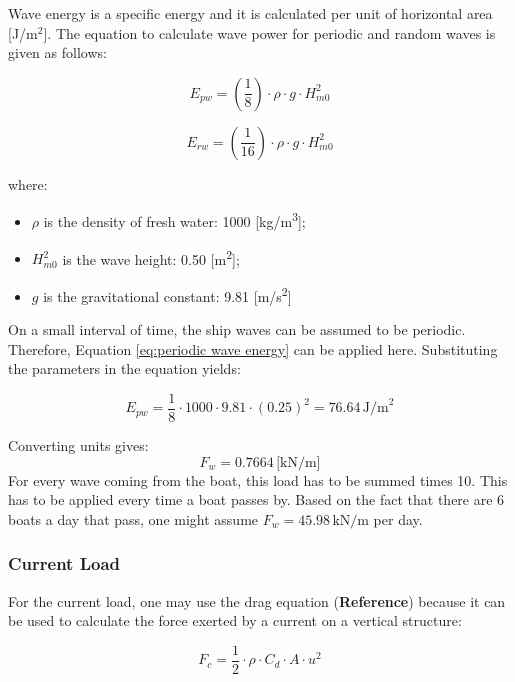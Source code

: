 Wave energy is a specific energy and it is calculated per unit of horizontal area [J/m$^2$]. The equation to calculate wave power for periodic and random waves is given as follows:

\begin{equation}
\label{eq:periodic wave energy}
    {E_{pw} = \left(\frac{1}{8}\right) \cdot \rho \cdot g \cdot H_{m0}^2}
\end{equation}

\begin{equation}
\label{eq:random wave energy}
    {E_{rw} = \left(\frac{1}{16}\right) \cdot \rho \cdot g \cdot H_{m0}^2}
\end{equation}

\noindent where:
\begin{itemize}
    \item $\rho$ is the density of fresh water: 1000 [kg/m\textsuperscript{3}];
    \item \(H_{m0}^2\) is the wave height: 0.50 [m\textsuperscript{2}];
    \item \(g\) is the gravitational constant: 9.81 [m/s\textsuperscript{2}]
\end{itemize}

On a small interval of time, the ship waves can be assumed to be periodic. Therefore, Equation \ref{eq:periodic wave energy} can be applied here. Substituting the parameters in the equation yields: 

$$
E_{pw} = \frac{1}{8} \cdot 1000 \cdot 9.81 \cdot (0.25)^2 = 76.64 \, \text{J/m}^2
$$

Converting units gives:
$$
{F_w}= 0.7664 \, \text{[kN/m]}
$$
For every wave coming from the boat, this load has to be summed times 10. This has to be applied every time a boat passes by. Based on the fact that there are 6 boats a day that pass, one might assume $ F_{w} = 45.98  \, \text{kN/m}$ per day. 

\subsubsection{Current Load}
For the current load, one may use the drag equation (\textbf{Reference})
because it can be used to calculate the force exerted by a current on a vertical structure:

\begin{equation}
\label{eq:drag load}
    F_c = \frac{1}{2} \cdot \rho \cdot C_d \cdot A \cdot u^2
\end{equation}


